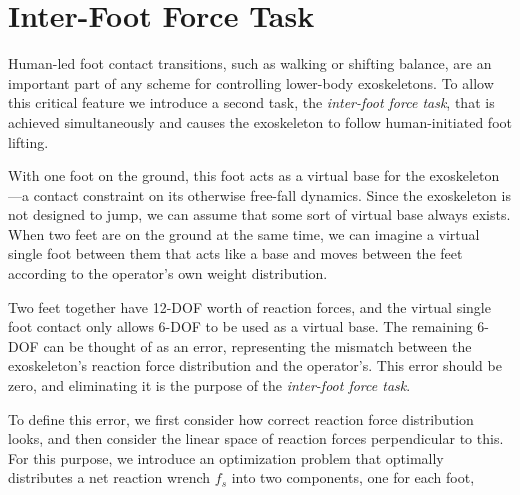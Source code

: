 \documentclass[utf8]{frontiersSCNS}
\begin{document}
\section{Inter-Foot Force Task}\label{sec:ift}


Human-led foot contact transitions, such as walking or shifting balance, are an important part of any scheme for controlling lower-body exoskeletons. To allow this critical feature we introduce a second task, the \emph{inter-foot force task}, that is achieved simultaneously and  causes the exoskeleton to follow human-initiated foot lifting.


With one foot on the ground, this foot acts as a virtual base for the exoskeleton---a contact constraint on its otherwise free-fall dynamics.
Since the exoskeleton is not designed to jump, we can assume that some sort of virtual base always exists.
When two feet are on the ground at the same time,
we can imagine a virtual single foot between them that acts like a base and moves between the feet according to the operator's own weight distribution.

Two feet together have 12-DOF worth of reaction forces, and the virtual single foot contact only allows 6-DOF to be used as a virtual base.
The remaining 6-DOF can be thought of as an error, representing the mismatch between the exoskeleton's reaction force distribution and the operator's.
This error should be zero, and eliminating it is the purpose of the \emph{inter-foot force task}.


To define this error, we first consider how correct reaction force distribution looks, and then consider the linear space of reaction forces perpendicular to this. For this purpose, we introduce an optimization problem that optimally distributes a net reaction wrench $f_s$ into two components, one for each foot,
\end{document}
